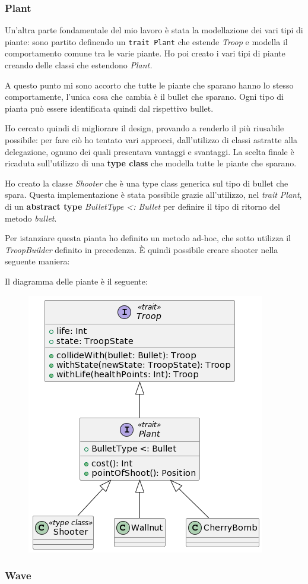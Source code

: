 \subsubsection{Plant}
Un'altra parte fondamentale del mio lavoro è stata la modellazione dei vari tipi di piante: sono partito definendo un \texttt{trait Plant} che estende \textit{Troop} e modella il comportamento comune tra le varie piante. Ho poi creato i vari tipi di piante creando delle classi che estendono \textit{Plant.}

A questo punto mi sono accorto che tutte le piante che sparano hanno lo stesso comportamente, l'unica cosa che cambia è il bullet che sparano. Ogni tipo di pianta può essere identificata quindi dal rispettivo bullet.

Ho cercato quindi di migliorare il design, provando a renderlo il più riusabile possibile: per fare ciò ho tentato vari approcci, dall'utilizzo di classi astratte alla delegazione, ognuno dei quali presentava vantaggi e svantaggi. La scelta finale è ricaduta sull'utilizzo di una \textbf{type class} che modella tutte le piante che sparano.

Ho creato la classe \textit{Shooter} che è una type class generica sul tipo di bullet che spara. Questa implementazione è stata possibile grazie all'utilizzo, nel \textit{trait Plant}, di un \textbf{abstract type} \textit{BulletType \textless: Bullet} per definire il tipo di ritorno del metodo \textit{bullet}.



Per istanziare questa pianta ho definito un metodo ad-hoc, che sotto utilizza il \textit{TroopBuilder} definito in precedenza. È quindi possibile creare shooter nella seguente maniera:



Il diagramma delle piante è il seguente:

\begin{figure}[H]
    \centering
    \includegraphics[width=0.8\linewidth]{images/plants.png}
    \label{Diagramma di sequenza del Troop Actor.}
\end{figure}

\subsubsection{Wave}